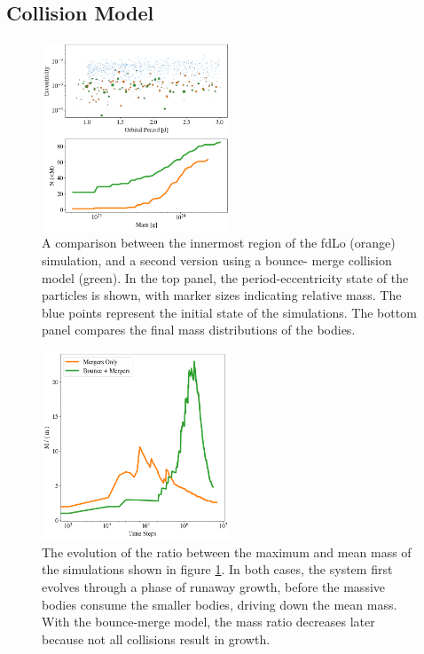 \documentclass[twocolumn]{aastex63}
\begin{document}
\subsection{Collision Model}

\begin{figure}
\begin{center}
    \includegraphics[width=0.5\textwidth]{figures/frag_ecc.png}
    \caption{A comparison between the innermost region of the fdLo (orange) simulation, and a second version using a bounce-
    merge collision model (green). In the top panel, the period-eccentricity state of the particles is shown, with marker sizes 
    indicating relative mass. The blue points represent the initial state of the simulations. The bottom panel compares the final 
    mass distributions of the bodies. \label{fig:frag_ecc}}
\end{center}
\end{figure}

\begin{figure}
\begin{center}
    \includegraphics[width=0.5\textwidth]{figures/frag_evo.png}
    \caption{The evolution of the ratio between the maximum and mean mass of the simulations shown in figure \ref{fig:frag_ecc}. 
    In both cases, the system first evolves through a phase of runaway growth, before the massive bodies consume the smaller 
    bodies, driving down the mean mass. With the bounce-merge model, the mass ratio decreases later because not all collisions 
    result in growth.\label{fig:frag_evo}}
\end{center}
\end{figure}
\end{document}
